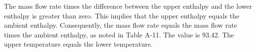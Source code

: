 The mass flow rate times the difference between the upper enthalpy and the lower enthalpy is greater than zero. This implies that the upper enthalpy equals the ambient enthalpy. Consequently, the mass flow rate equals the mass flow rate times the ambient enthalpy, as noted in Table A-11. The value is 93.42. The upper temperature equals the lower temperature.